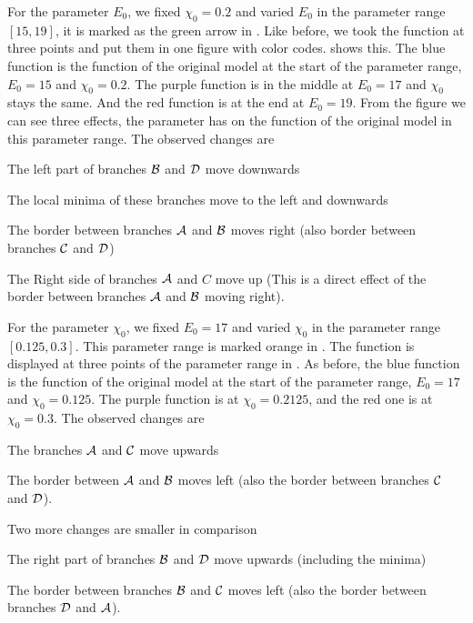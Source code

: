 For the parameter $E_0$, we fixed $\chi_0 = 0.2$ and varied $E_0$ in the parameter range $[15, 19]$, it is marked as the green arrow in .
Like before, we took the function at three points and put them in one figure with color codes.
 shows this.
The blue function is the function of the original model at the start of the parameter range, $E_0 = 15$ and $\chi_0 = 0.2$.
The purple function is in the middle at $E_0 = 17$ and $\chi_0$ stays the same.
And the red function is at the end at $E_0 = 19$.
From the figure we can see three effects, the parameter has on the function of the original model in this parameter range.
The observed changes are
\begin{enumerate*}
    \item The left part of branches $\mathcal{B}$ and $\mathcal{D}$ move downwards
    \item The local minima of these branches move to the left and downwards
    \item The border between branches $\mathcal{A}$ and $\mathcal{B}$ moves right (also border between branches $\mathcal{C}$ and $\mathcal{D}$)
    \item The Right side of branches $\mathcal{A}$ and $C$ move up (This is a direct effect of the border between branches $\mathcal{A}$ and $\mathcal{B}$ moving right).
\end{enumerate*}

For the parameter $\chi_0$, we fixed $E_0 = 17$ and varied $\chi_0$ in the parameter range $[0.125, 0.3]$.
This parameter range is marked orange in .
The function is displayed at three points of the parameter range in .
As before, the blue function is the function of the original model at the start of the parameter range, $E_0 = 17$ and $\chi_0 = 0.125$.
The purple function is at $\chi_0 = 0.2125$, and the red one is at $\chi_0 = 0.3$.
The observed changes are
\begin{enumerate*}
    \item The branches $\mathcal{A}$ and $\mathcal{C}$ move upwards
    \item The border between $\mathcal{A}$ and $\mathcal{B}$ moves left (also the border between branches $\mathcal{C}$ and $\mathcal{D}$).
\end{enumerate*}
Two more changes are smaller in comparison
\begin{enumerate*}
    \item The right part of branches $\mathcal{B}$ and $\mathcal{D}$ move upwards (including the minima)
    \item The border between branches $\mathcal{B}$ and $\mathcal{C}$ moves left (also the border between branches $\mathcal{D}$ and $\mathcal{A}$).
\end{enumerate*}

